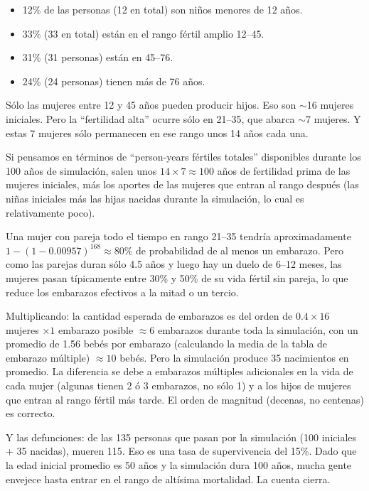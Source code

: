 \documentclass[12pt,a4paper]{article}
\begin{document}
\begin{itemize}
    \item 12\% de las personas (12 en total) son niños menores de 12 años.
    \item 33\% (33 en total) están en el rango fértil amplio 12--45.
    \item 31\% (31 personas) están en 45--76.
    \item 24\% (24 personas) tienen más de 76 años.
\end{itemize}

Sólo las mujeres entre 12 y 45 años pueden producir hijos. Eso son $\sim$16 mujeres iniciales. Pero la ``fertilidad alta'' ocurre sólo en 21--35, que abarca $\sim$7 mujeres. Y estas 7 mujeres sólo permanecen en ese rango unos 14 años cada una.

Si pensamos en términos de ``person-years fértiles totales'' disponibles durante los 100 años de simulación, salen unos $14 \times 7 \approx 100$ años de fertilidad prima de las mujeres iniciales, más los aportes de las mujeres que entran al rango después (las niñas iniciales más las hijas nacidas durante la simulación, lo cual es relativamente poco).

Una mujer con pareja todo el tiempo en rango 21--35 tendría aproximadamente $1 - (1 - 0.00957)^{168} \approx 80\%$ de probabilidad de al menos un embarazo. Pero como las parejas duran sólo 4.5 años y luego hay un duelo de 6--12 meses, las mujeres pasan típicamente entre 30\% y 50\% de su vida fértil sin pareja, lo que reduce los embarazos efectivos a la mitad o un tercio.

Multiplicando: la cantidad esperada de embarazos es del orden de $0.4 \times 16$ mujeres $\times 1$ embarazo posible $\approx 6$ embarazos durante toda la simulación, con un promedio de 1.56 bebés por embarazo (calculando la media de la tabla de embarazo múltiple) $\approx 10$ bebés. Pero la simulación produce 35 nacimientos en promedio. La diferencia se debe a embarazos múltiples adicionales en la vida de cada mujer (algunas tienen 2 ó 3 embarazos, no sólo 1) y a los hijos de mujeres que entran al rango fértil más tarde. El orden de magnitud (decenas, no centenas) es correcto.

Y las defunciones: de las 135 personas que pasan por la simulación (100 iniciales + 35 nacidas), mueren 115. Eso es una tasa de supervivencia del 15\%. Dado que la edad inicial promedio es 50 años y la simulación dura 100 años, mucha gente envejece hasta entrar en el rango de altísima mortalidad. La cuenta cierra.
\end{document}
